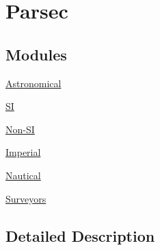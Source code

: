 \hypertarget{group___e_g_x_math-_conversions-_length_conversions-_astronomical-_parsec}{}\section{Parsec}
\label{group___e_g_x_math-_conversions-_length_conversions-_astronomical-_parsec}
\subsection*{Modules}
\begin{DoxyCompactItemize}
\item 
\mbox{\hyperlink{group___e_g_x_math-_conversions-_length_conversions-_astronomical-_parsec-_astronomical}{Astronomical}}
\item 
\mbox{\hyperlink{group___e_g_x_math-_conversions-_length_conversions-_astronomical-_parsec-_s_i}{SI}}
\item 
\mbox{\hyperlink{group___e_g_x_math-_conversions-_length_conversions-_astronomical-_parsec-_non-_s_i}{Non-\/\+SI}}
\item 
\mbox{\hyperlink{group___e_g_x_math-_conversions-_length_conversions-_astronomical-_parsec-_imperial}{Imperial}}
\item 
\mbox{\hyperlink{group___e_g_x_math-_conversions-_length_conversions-_astronomical-_parsec-_nautical}{Nautical}}
\item 
\mbox{\hyperlink{group___e_g_x_math-_conversions-_length_conversions-_astronomical-_parsec-_surveyors}{Surveyors}}
\end{DoxyCompactItemize}


\subsection{Detailed Description}
